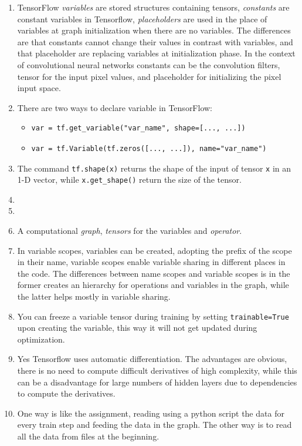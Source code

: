 \documentclass{article}
\begin{document}
\begin{enumerate}
\item TensorFlow \emph{variables} are stored structures containing tensors, \emph{constants} are constant variables in Tensorflow, \emph{placeholders} are used in the place of variables at graph initialization when there are no variables. The differences are that constants cannot change their values in contrast with variables, and that placeholder are replacing variables at initialization phase.
In the context of convolutional neural networks constants can be the convolution filters, tensor for the input pixel values, and placeholder for initializing the pixel input space.
\item There are two ways to declare variable in TensorFlow:
\begin{itemize}
\item \begin{small}
\begin{verbatim}
var = tf.get_variable("var_name", shape=[..., ...])
\end{verbatim}
\end{small}
\item \begin{small}
\begin{verbatim}
var = tf.Variable(tf.zeros([..., ...]), name="var_name")
\end{verbatim}
\end{small}
\end{itemize}

\item The command \texttt{tf.shape(x)} returns the shape of the input of tensor \texttt{x} in an 1-D vector, while \texttt{x.get\_shape()} return the size of the tensor.
\item
\item
\item A computational \emph{graph}, \emph{tensors} for the variables and \emph{operator}.
\item In variable scopes, variables can be created, adopting the prefix of the scope in their name, variable scopes enable variable sharing in different places in the code. The differences between name scopes and variable scopes is in the former creates an hierarchy for operations and variables in the graph, while the latter helps mostly in variable sharing.
\item You can freeze a variable tensor during training by setting \texttt{trainable=True} upon creating the variable, this way it will not get updated during optimization.
\item Yes Tensorflow uses automatic differentiation.
The advantages are obvious, there is no need to compute difficult derivatives of high complexity, while this can be a disadvantage for large numbers of hidden layers due to dependencies to compute the derivatives.
\item One way is like the assignment, reading using a python script the data for every train step and feeding the data in the graph.
The other way is to read all the data from files at the beginning.
\end{enumerate}
\end{document}

